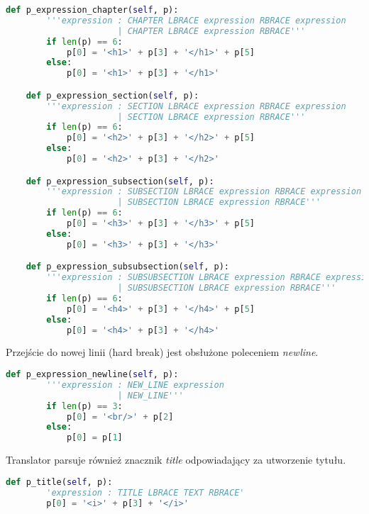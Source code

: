 \begin{lstlisting}[language={Python}, caption={Rozdziały, sekcje i podsekcje}, label={gramatyka-sekcje-podsekcje}]
    def p_expression_chapter(self, p):
        '''expression : CHAPTER LBRACE expression RBRACE expression
                      | CHAPTER LBRACE expression RBRACE'''
        if len(p) == 6:
            p[0] = '<h1>' + p[3] + '</h1>' + p[5]
        else:
            p[0] = '<h1>' + p[3] + '</h1>'

    def p_expression_section(self, p):
        '''expression : SECTION LBRACE expression RBRACE expression
                      | SECTION LBRACE expression RBRACE'''
        if len(p) == 6:
            p[0] = '<h2>' + p[3] + '</h2>' + p[5]
        else:
            p[0] = '<h2>' + p[3] + '</h2>'

    def p_expression_subsection(self, p):
        '''expression : SUBSECTION LBRACE expression RBRACE expression
                      | SUBSECTION LBRACE expression RBRACE'''
        if len(p) == 6:
            p[0] = '<h3>' + p[3] + '</h3>' + p[5]
        else:
            p[0] = '<h3>' + p[3] + '</h3>'

    def p_expression_subsubsection(self, p):
        '''expression : SUBSUBSECTION LBRACE expression RBRACE expression
                      | SUBSUBSECTION LBRACE expression RBRACE'''
        if len(p) == 6:
            p[0] = '<h4>' + p[3] + '</h4>' + p[5]
        else:
            p[0] = '<h4>' + p[3] + '</h4>'
\end{lstlisting}

Przejście do nowej linii (hard break) jest obsłużone poleceniem \textit{newline}.

\begin{lstlisting}[language={Python}, caption={Nowa linia}, label={gramatyka-nowa-linia}]
    def p_expression_newline(self, p):
        '''expression : NEW_LINE expression
                      | NEW_LINE'''
        if len(p) == 3:
            p[0] = '<br/>' + p[2]
        else:
            p[0] = p[1]
\end{lstlisting}

Translator parsuje również znacznik \textit{title} odpowiadający za utworzenie tytułu.

\begin{lstlisting}[language={Python}, caption={Tytuł}, label={gramatyka-tyti}]
    def p_title(self, p):
        'expression : TITLE LBRACE TEXT RBRACE'
        p[0] = '<i>' + p[3] + '</i>'
\end{lstlisting}